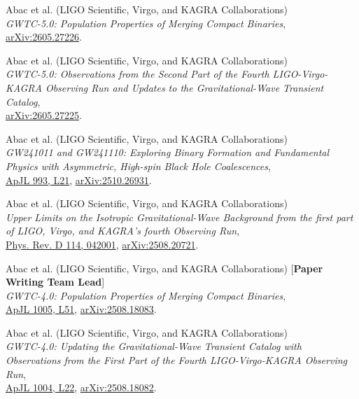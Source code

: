 \begin{etaremune}
	\item Abac et al. (LIGO Scientific, Virgo, and KAGRA Collaborations)\\
	\textit{GWTC-5.0: Population Properties of Merging Compact Binaries},\\
	\href{https://ui.adsabs.harvard.edu/#abs/2026arXiv260527226T/abstract}{arXiv:2605.27226}.

	\item Abac et al. (LIGO Scientific, Virgo, and KAGRA Collaborations)\\
	\textit{GWTC-5.0: Observations from the Second Part of the Fourth LIGO-Virgo-KAGRA Observing Run and Updates to the Gravitational-Wave Transient Catalog},\\
	\href{https://ui.adsabs.harvard.edu/#abs/2026arXiv260527225T/abstract}{arXiv:2605.27225}.

	\item Abac et al. (LIGO Scientific, Virgo, and KAGRA Collaborations)\\
	\textit{GW241011 and GW241110: Exploring Binary Formation and Fundamental Physics with Asymmetric, High-spin Black Hole Coalescences},\\
	\href{https://doi.org/10.3847/2041-8213/ae0d54}{ApJL 993, L21}, \href{https://arxiv.org/abs/2510.26931}{arXiv:2510.26931}.

	\item Abac et al. (LIGO Scientific, Virgo, and KAGRA Collaborations)\\
	\textit{Upper Limits on the Isotropic Gravitational-Wave Background from the first part of LIGO, Virgo, and KAGRA's fourth Observing Run},\\
	\href{https://doi.org/10.1103/wq57-sjt2}{Phys. Rev. D 114, 042001}, \href{https://arxiv.org/abs/2508.20721}{arXiv:2508.20721}.

	\item Abac et al. (LIGO Scientific, Virgo, and KAGRA Collaborations) [\textbf{Paper Writing Team Lead}]\\
	\textit{GWTC-4.0: Population Properties of Merging Compact Binaries},\\
	\href{https://doi.org/10.3847/2041-8213/ae771e}{ApJL 1005, L51}, \href{https://arxiv.org/abs/2508.18083}{arXiv:2508.18083}.

	\item Abac et al. (LIGO Scientific, Virgo, and KAGRA Collaborations)\\
	\textit{GWTC-4.0: Updating the Gravitational-Wave Transient Catalog with Observations from the First Part of the Fourth LIGO-Virgo-KAGRA Observing Run},\\
	\href{https://doi.org/10.3847/2041-8213/ae2c74}{ApJL 1004, L22}, \href{https://arxiv.org/abs/2508.18082}{arXiv:2508.18082}.


\end{etaremune}
